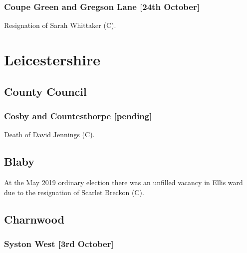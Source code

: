 \documentclass[a4paper,openany]{book}
\begin{document}
\begin{resultsiii}
\subsubsection*{Coupe Green and Gregson Lane \hspace*{\fill}\nolinebreak[1]%
	\enspace\hspace*{\fill}
	[24th October]}


Resignation of Sarah Whittaker (C).

\section{Leicestershire}

\subsection*{County Council}

\subsubsection*{Cosby and Countesthorpe \hspace*{\fill}\nolinebreak[1]%
	\enspace\hspace*{\fill}
	[pending]}


Death of David Jennings (C).

\subsection*{Blaby}

At the May 2019 ordinary election there was an unfilled vacancy in Ellis ward due to the resignation of Scarlet Breckon (C).

\subsection*{Charnwood}

\subsubsection*{Syston West \hspace*{\fill}\nolinebreak[1]%
	\enspace\hspace*{\fill}
	[3rd October]}


\end{resultsiii}
\end{document}
